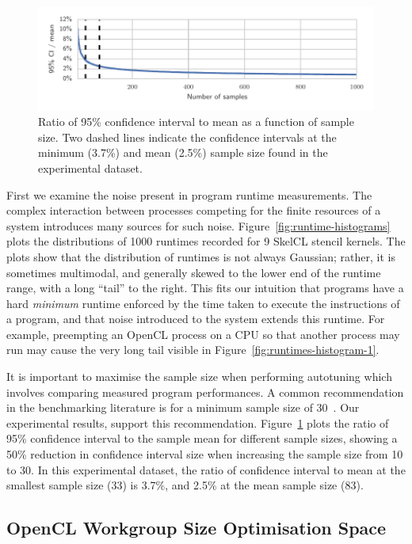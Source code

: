 \documentclass[nonatbib,preprint,9pt]{sigplanconf}
\begin{document}
\begin{figure}
\centering
\includegraphics[width=\columnwidth]{img/ci_trend}
\caption[Confidence interval size vs.\ sample count]{%
  Ratio of 95\% confidence interval to mean as a function of sample
  size. Two dashed lines indicate the confidence intervals at the
  minimum (3.7\%) and mean (2.5\%) sample size found in the
  experimental dataset.%
}
\label{fig:ci-trends}
\end{figure}

First we examine the noise present in program runtime
measurements. The complex interaction between processes competing for
the finite resources of a system introduces many sources for such
noise. Figure~\ref{fig:runtime-histograms} plots the distributions of
1000 runtimes recorded for 9 SkelCL stencil kernels. The plots show
that the distribution of runtimes is not always Gaussian; rather, it
is sometimes multimodal, and generally skewed to the lower end of the
runtime range, with a long ``tail'' to the right. This fits our
intuition that programs have a hard \emph{minimum} runtime enforced by
the time taken to execute the instructions of a program, and that
noise introduced to the system extends this runtime. For example,
preempting an OpenCL process on a CPU so that another process may run
may cause the very long tail visible in
Figure~\ref{fig:runtimes-histogram-1}.

It is important to maximise the sample size when performing autotuning
which involves comparing measured program performances. A common
recommendation in the benchmarking literature is for a minimum sample
size of 30~\cite{Georges2007}. Our experimental results, support this
recommendation. Figure~\ref{fig:ci-trends} plots the ratio of 95\%
confidence interval to the sample mean for different sample sizes,
showing a 50\% reduction in confidence interval size when increasing
the sample size from 10 to 30. In this experimental dataset, the ratio
of confidence interval to mean at the smallest sample size (33) is
3.7\%, and 2.5\% at the mean sample size (83).


\subsection{OpenCL Workgroup Size Optimisation Space}
\end{document}
